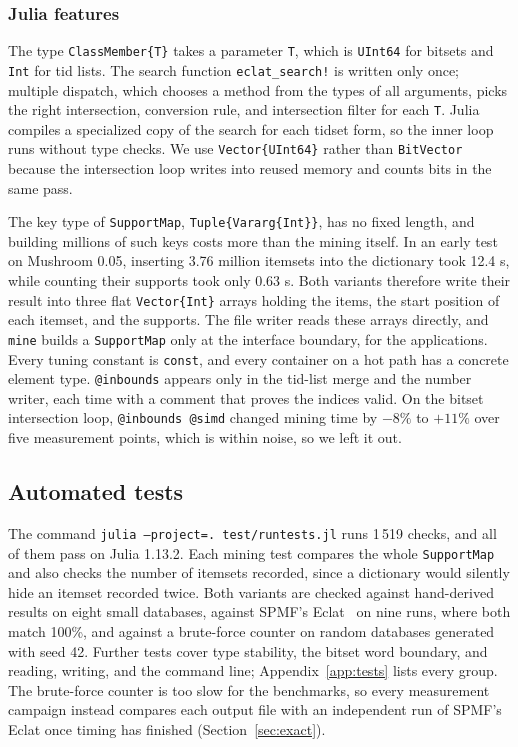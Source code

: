 \subsubsection{Julia features}
The type \texttt{ClassMember\{T\}} takes a parameter \texttt{T}, which is \texttt{UInt64}
for bitsets and \texttt{Int} for tid lists. The search function \texttt{eclat\_search!}
is written only once; multiple dispatch, which chooses a method from the types of all
arguments, picks the right intersection, conversion rule, and intersection filter for
each \texttt{T}. Julia compiles a specialized copy of the search for each tidset form, so
the inner loop runs without type checks. We use \texttt{Vector\{UInt64\}} rather than
\texttt{BitVector} because the intersection loop writes into reused memory and counts
bits in the same pass.

The key type of \texttt{SupportMap}, \texttt{Tuple\{Vararg\{Int\}\}}, has no fixed length,
and building millions of such keys costs more than the mining itself. In an early test on
Mushroom 0.05, inserting 3.76 million itemsets into the dictionary took 12.4 s, while
counting their supports took only 0.63 s. Both variants therefore write their result into
three flat \texttt{Vector\{Int\}} arrays holding the items, the start position of each
itemset, and the supports. The file writer reads these arrays directly, and \texttt{mine}
builds a \texttt{SupportMap} only at the interface boundary, for the applications. Every
tuning constant is \texttt{const}, and every container on a hot path has a concrete
element type. \texttt{@inbounds} appears only in the tid-list merge and the number writer,
each time with a comment that proves the indices valid. On the bitset intersection loop,
\texttt{@inbounds @simd} changed mining time by $-8\%$ to $+11\%$ over five measurement
points, which is within noise, so we left it out.

\subsection{Automated tests}
\label{sec:tests}
The command \texttt{julia --project=. test/runtests.jl} runs 1\,519 checks, and all of
them pass on Julia 1.13.2. Each mining test compares the whole \texttt{SupportMap} and
also checks the number of itemsets recorded, since a dictionary would silently hide an
itemset recorded twice. Both variants are checked against hand-derived results on eight
small databases, against SPMF's Eclat~\cite{spmf2016} on nine runs, where both match
100\%, and against a brute-force counter on random databases generated with seed 42.
Further tests cover type stability, the bitset word boundary, and reading, writing, and
the command line; Appendix~\ref{app:tests} lists every group. The brute-force counter is
too slow for the benchmarks, so every measurement campaign instead compares each output
file with an independent run of SPMF's Eclat once timing has finished
(Section~\ref{sec:exact}).

